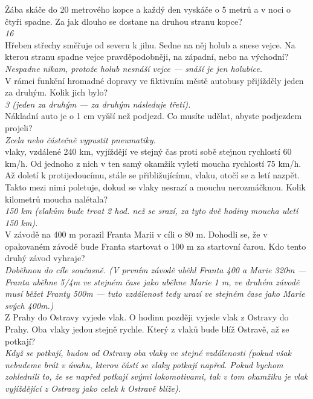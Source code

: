 \begin{multicols}{\value{columnsgames}}
\noindent
Žába skáče do 20 metrového kopce a každý den vyskáče o 5 
metrů a v noci o čtyři spadne. Za jak dlouho se dostane na druhou 
stranu kopce?\\[1 mm]
{\sl 16}\\

\noindent
Hřeben střechy směřuje od severu k jihu. Sedne na něj holub 
a snese vejce. Na kterou stranu spadne vejce pravděpodobněji, 
na západní, nebo na východní?\\[1 mm]
{\sl Nespadne nikam, protože holub nesnáší vejce --- snáší je 
jen holubice.}\\

\noindent
V rámci funkční hromadné dopravy ve fiktivním městě autobusy 
přijížděly jeden za druhým. Kolik jich bylo?\\[1 mm]
{\sl 3 (jeden za druhým --- za druhým následuje třetí).}\\

\noindent
Nákladní auto je o 1 cm vyšší než podjezd. Co musíte udělat, 
abyste podjezdem projeli?\\[1 mm]
{\sl Zcela nebo částečně vypustit pneumatiky.}\\

 vlaky, vzdálené 240 km, vyjíždějí ve stejný čas proti sobě 
stejnou rychlostí 60 km/h. Od jednoho z nich v ten samý okamžik 
vyletí moucha rychlostí 75 km/h. Až doletí k protijedoucímu, 
stále se přibližujícímu, vlaku, otočí se a letí nazpět. Takto 
mezi nimi poletuje, dokud se vlaky nesrazí a mouchu nerozmáčknou. 
Kolik kilometrů moucha nalétala?\\[1 mm]
{\sl 150 km (vlakům bude trvat 2 hod. než se srazí, za tyto dvě
hodiny moucha uletí 150 km).}\\

\noindent
V závodě na 400 m porazil Franta Marii v cíli o 80 m. Dohodli 
se, že v opakovaném závodě bude Franta startovat o 100 m za startovní 
čarou. Kdo tento druhý závod vyhraje?\\[1 mm]
{\sl Doběhnou do cíle současně. (V prvním závodě uběhl Franta 400 
a Marie 320m --- Franta uběhne 5/4m ve stejném čase jako uběhne 
Marie 1 m, ve druhém závodě musí běžet Franty 500m --- tuto vzdálenost 
tedy urazí ve stejném čase jako Marie svých 400m.)}\\

\noindent
Z Prahy do Ostravy vyjede vlak. O hodinu později vyjede vlak 
z Ostravy do Prahy. Oba vlaky jedou stejně rychle. Který z vlaků 
bude blíž Ostravě, až se potkají?\\[1 mm]
{\sl Když se potkají, budou od Ostravy oba vlaky ve stejné vzdálenosti 
(pokud však nebudeme brát v úvahu, kterou částí se vlaky potkají 
napřed. Pokud bychom zohlednili to, že se napřed potkají svými 
lokomotivami, tak v tom okamžiku je vlak vyjíždějící z Ostravy 
jako celek k Ostravě blíže).}\\


\end{multicols}
